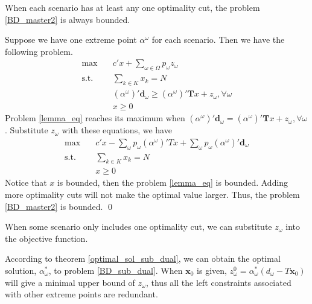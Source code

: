 \begin{lem}\label{one_ep_feasible}
When each scenario has at least any one optimality cut, the problem \eqref{BD_master2} is always bounded.
\end{lem}

\begin{pf}
  Suppose we have one extreme point $\alpha^{\omega}$ for each scenario. Then we have the following problem.
  \begin{equation}\label{lemma_eq}
    \begin{aligned}
      \max \quad & c{'} x + \sum_{\omega \in \Omega} p_{\omega} z_{\omega} \\
      \text {s.t.} \quad & \sum_{k \in K} x_k = N \\
      & (\alpha^{\omega}){'}\mathbf{d}_{\omega} \geq (\alpha^{\omega}){'} \mathbf{T}x + z_{\omega}, \forall \omega \\
       & x \geq 0
    \end{aligned}
  \end{equation}
  Problem \eqref{lemma_eq} reaches its maximum when $(\alpha^{\omega}){'}\mathbf{d}_{\omega} = (\alpha^{\omega}){'} \mathbf{T}x + z_{\omega}, \forall \omega$. Substitute $z_{\omega}$ with these equations, we have 
  \begin{equation}\label{lemma_eq2}
    \begin{aligned}
      \max \quad & c{'} x - \sum_{\omega}p_{\omega}(\alpha^{\omega}){'}Tx + \sum_{\omega} p_{\omega} (\alpha^{\omega}){'} \mathbf{d}_{\omega} \\
      \text {s.t.} \quad & \sum_{k \in K} x_k = N \\
      & x \geq 0
    \end{aligned}
  \end{equation}
  Notice that $x$ is bounded, then the problem \eqref{lemma_eq} is bounded. Adding more optimality cuts will not make the optimal value larger. Thus, the problem \eqref{BD_master2} is bounded. 
  \qed
\end{pf}


When some scenario only includes one optimality cut, we can substitute $z_{\omega}$ into the objective function. 

According to theorem \ref{optimal_sol_sub_dual}, we can obtain the optimal solution, $\alpha_{\omega}^{*}$, to problem \eqref{BD_sub_dual}. When $\mathbf{x}_0$ is given, $z_{\omega}^{0} = \alpha_{\omega}^{*}(d_{\omega} - T \mathbf{x}_0)$ will give a minimal upper bound of $z_{\omega}$, thus all the left constraints associated with other extreme points are redundant.

